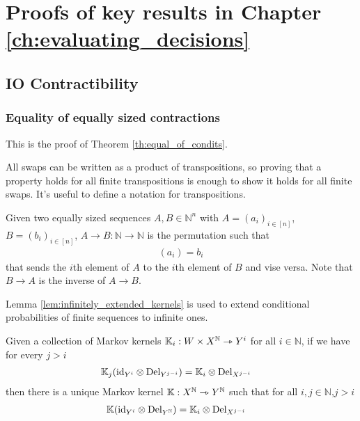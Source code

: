 

\chapter{Proofs of key results in Chapter \ref{ch:evaluating_decisions}} %

\label{AppendixB} %

\section{IO Contractibility}\label{sec:io_contract_proof}

\subsection{Equality of equally sized contractions}

This is the proof of Theorem \ref{th:equal_of_condits}.

All swaps can be written as a product of transpositions, so proving that a property holds for all finite transpositions is enough to show it holds for all finite swaps. It's useful to define a notation for transpositions.

\begin{definition}
Given two equally sized sequences $A,B\in \mathbb{N}^n$ with $A=(a_i)_{i\in [n]}$, $B=(b_i)_{i\in [n]}$, ${A\rightarrow B}:\mathbb{N}\to \mathbb{N}$ is the permutation such that 
\begin{align}
	[A\rightarrow B](a_i) = b_i
\end{align}that sends the $i$th element of $A$ to the $i$th element of $B$ and vise versa. Note that $B\rightarrow A$ is the inverse of $A\rightarrow B$.
\end{definition}

Lemma \ref{lem:infinitely_extended_kernels} is used to extend conditional probabilities of finite sequences to infinite ones. 

\begin{lemma}\label{lem:infinitely_extended_kernels}
Given a collection of Markov kernels $\mathbb{K}_i:W\times X^{\mathbb{N}}\rightarrowtriangle Y^i$ for all $i\in \mathbb{N}$, if we have for every $j>i$
\begin{align}
    \mathbb{K}_j(\text{id}_{Y^i}\otimes \text{Del}_{Y^{j-i}}) &= \mathbb{K}_i\otimes \text{Del}_{X^{j-i}}\label{eqApp:marginalise_comb}
\end{align} 
then there is a unique Markov kernel $\mathbb{K}:X^{\mathbb{N}}\rightarrowtriangle Y^{\mathbb{N}}$ such that for all $i,j\in \mathbb{N}$,$j>i$
\begin{align}
    \mathbb{K}(\text{id}_{Y^i}\otimes \text{Del}_{Y^{\mathbb{N}}})&= \mathbb{K}_i\otimes \text{Del}_{X^{j-i}}
\end{align}
\end{lemma}


